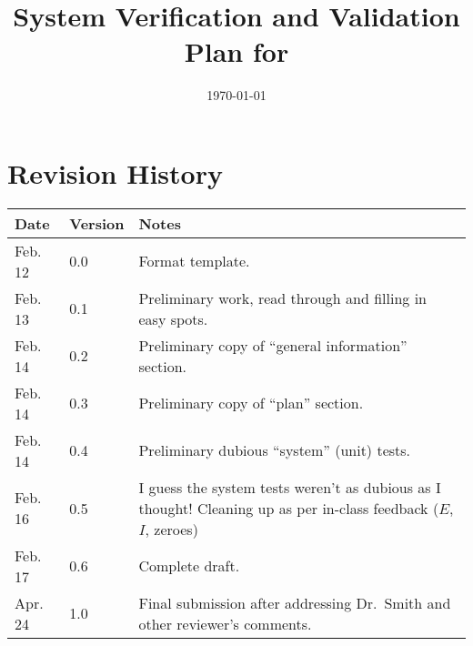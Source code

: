 \documentclass[12pt, titlepage]{article}
\begin{document}

\title{System Verification and Validation Plan for \progname{}}
\author{\authname}
\date{\today}

\maketitle



\section{Revision History}

\begin{tabularx}{\textwidth}{p{3cm}p{2cm}X} \toprule {
    \bf Date} & {\bf Version} & {\bf Notes}                                                                                                       \\
    \midrule
    Feb. 12    & 0.0           & Format template.                                                                                                  \\
    Feb. 13    & 0.1           & Preliminary work, read through and filling in easy spots.                                                         \\
    Feb. 14    & 0.2           & Preliminary copy of ``general information'' section.                                                              \\
    Feb. 14    & 0.3           & Preliminary copy of ``plan'' section.                                                                             \\
    Feb. 14    & 0.4           & Preliminary dubious ``system'' (unit) tests.                                                                      \\
    Feb. 16    & 0.5           & I guess the system tests weren't as dubious as I thought! Cleaning up as per in-class feedback ($E$, $I$, zeroes) \\
    Feb. 17    & 0.6           & Complete draft.                                                                                                   \\
    Apr. 24    & 1.0           & Final submission after addressing Dr.~Smith and other reviewer's comments.                                                                                                   \\
    \bottomrule
\end{tabularx}
\end{document}
